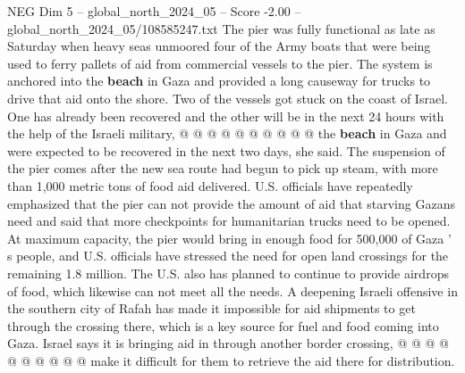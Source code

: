 \begin{textsample}{NEG Dim 5 – global\_north\_2024\_05 – Score -2.00 – global\_north\_2024\_05/108585247.txt}
The pier was fully functional as late as Saturday when heavy seas unmoored four of the Army boats that were being used to ferry pallets of aid from commercial vessels to the pier.
The system is anchored into the \textbf{beach} in Gaza and provided a long causeway for trucks to drive that aid onto the shore.
Two of the vessels got stuck on the coast of Israel.
One has already been recovered and the other will be in the next 24 hours with the help of the Israeli military, @ @ @ @ @ @ @ @ @ @ the \textbf{beach} in Gaza and were expected to be recovered in the next two days, she said.
The suspension of the pier comes after the new sea route had begun to pick up steam, with more than 1,000 metric tons of food aid delivered.
U.S. officials have repeatedly emphasized that the pier can not provide the amount of aid that starving Gazans need and said that more checkpoints for humanitarian trucks need to be opened.
At maximum capacity, the pier would bring in enough food for 500,000 of Gaza ' s people, and U.S. officials have stressed the need for open land crossings for the remaining 1.8 million.
The U.S. also has planned to continue to provide airdrops of food, which likewise can not meet all the needs.
A deepening Israeli offensive in the southern city of Rafah has made it impossible for aid shipments to get through the crossing there, which is a key source for fuel and food coming into Gaza.
Israel says it is bringing aid in through another border crossing, @ @ @ @ @ @ @ @ @ @ make it difficult for them to retrieve the aid there for distribution.

\end{textsample}
